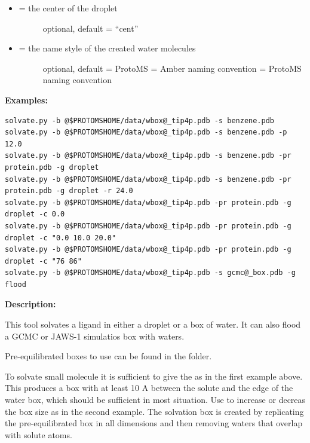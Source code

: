 \documentclass[letterpaper,10pt,english]{manual}
\begin{document}
\begin{itemize}
\begin{description}
\end{description}

\item {} \begin{description}
\item[{ = the center of the droplet}] \leavevmode
optional, default = ``cent''

\end{description}

\item {} \begin{description}
\item[{ = the name style of the created water molecules}] \leavevmode
optional, default = ProtoMS
 = Amber naming convention
 = ProtoMS naming convention

\end{description}

\end{itemize}

\textbf{Examples:}

\begin{Verbatim}[commandchars=@\[\]]
solvate.py -b @$PROTOMSHOME/data/wbox@_tip4p.pdb -s benzene.pdb
solvate.py -b @$PROTOMSHOME/data/wbox@_tip4p.pdb -s benzene.pdb -p 12.0
solvate.py -b @$PROTOMSHOME/data/wbox@_tip4p.pdb -s benzene.pdb -pr protein.pdb -g droplet
solvate.py -b @$PROTOMSHOME/data/wbox@_tip4p.pdb -s benzene.pdb -pr protein.pdb -g droplet -r 24.0
solvate.py -b @$PROTOMSHOME/data/wbox@_tip4p.pdb -pr protein.pdb -g droplet -c 0.0
solvate.py -b @$PROTOMSHOME/data/wbox@_tip4p.pdb -pr protein.pdb -g droplet -c "0.0 10.0 20.0"
solvate.py -b @$PROTOMSHOME/data/wbox@_tip4p.pdb -pr protein.pdb -g droplet -c "76 86"
solvate.py -b @$PROTOMSHOME/data/wbox@_tip4p.pdb -s gcmc@_box.pdb -g flood
\end{Verbatim}

\textbf{Description:}

This tool solvates a ligand in either a droplet or a box of water. It can also flood a GCMC or JAWS-1 simulatios box with waters.

Pre-equilibrated boxes to use can be found in the  folder.

To solvate small molecule it is sufficient to give the  as in the first example above. This produces a box with at least 10 A between the solute and the edge of the water box, which should be sufficient in most situation. Use  to increase or decreas the box size as in the second example. The solvation box is created by replicating the pre-equilibrated box in all dimensions and then removing waters that overlap with solute atoms.
\end{document}
